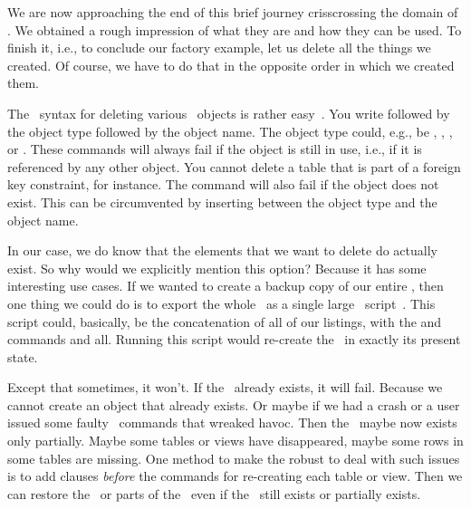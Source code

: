 %
%
\label{sec:simpleExampleCleanup}%
%
We are now approaching the end of this brief journey crisscrossing the domain of .
We obtained a rough impression of what they are and how they can be used.
To finish it, i.e., to conclude our factory example, let us delete all the things we created.
Of course, we have to do that in the opposite order in which we created them.

%
\FloatBarrier%
%
%
%
%
%
%
%
The \sql\ syntax for deleting various \db\ objects is rather easy~\cite{PGDG:PD:DU,PGDG:PD:DD,PGDG:PD:DT,PGDG:PD:DV}.
You write  followed by the object type followed by the object name.
The object type could, e.g., be , , , or .
These commands will always fail if the object is still in use, i.e., if it is referenced by any other object.
You cannot delete a table that is part of a foreign key constraint, for instance.
The command will also fail if the object does not exist.
This can be circumvented by inserting  between the object type and the object name.

In our case, we do know that the elements that we want to delete do actually exist.
So why would we explicitly mention this  option?
Because it has some interesting use cases.
If we wanted to create a backup copy of our entire \db, then one thing we could do is to export the whole \db\ as a single large \sql~script~\cite{PGDG:PD:SD}.
This script could, basically, be the concatenation of all of our listings, with the  and  commands and all.
Running this script would re-create the \db\ in exactly its present state.

Except that sometimes, it won't.
If the \db\ already exists, it will fail.
Because we cannot create an object that already exists.
Or maybe if we had a crash or a user issued some faulty \sql\ commands that wreaked havoc.
Then the \db\ maybe now exists only partially.
Maybe some tables or views have disappeared, maybe some rows in some tables are missing.
One method to make the  robust to deal with such issues is to add  clauses \emph{before} the commands for re-creating each table or view.
Then we can restore the \db\ or parts of the \db\ even if the \db\ still exists or partially exists.

